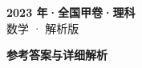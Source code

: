\documentclass[zihao=-4, a4paper]{ctexart}
\begin{document}
\begin{center}
  {\Large\bfseries 2023 年·全国甲卷·理科}\\[4pt]
  {\large 数学 · 解析版}
\end{center}
\medskip
{}

\clearpage
{}
\begin{center}{\Large\bfseries 参考答案与详细解析}\end{center}
\medskip

\end{document}
